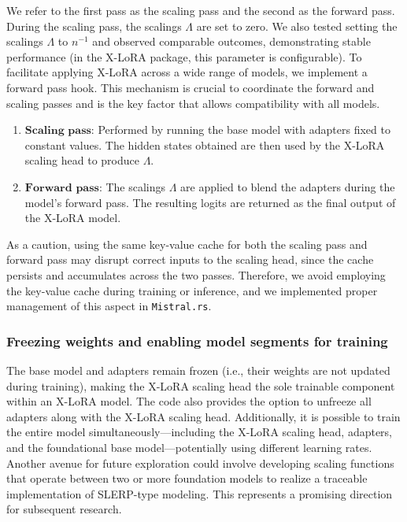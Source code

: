 We refer to the first pass as the scaling pass and the second as the forward pass. During the scaling pass, the scalings $\Lambda$ are set to zero. We also tested setting the scalings $\Lambda$ to ${n}^{-1}$ and observed comparable outcomes, demonstrating stable performance (in the X-LoRA package, this parameter is configurable). To facilitate applying X-LoRA across a wide range of models, we implement a forward pass hook. This mechanism is crucial to coordinate the forward and scaling passes and is the key factor that allows compatibility with all models.

\begin{enumerate}
    \item $\mathbf{Scaling}$ $\mathbf{pass}$: Performed by running the base model with adapters fixed to constant values. The hidden states obtained are then used by the X-LoRA scaling head to produce $\Lambda$.
    \item $\mathbf{Forward}$ $\mathbf{pass}$: The scalings $\Lambda$ are applied to blend the adapters during the model’s forward pass. The resulting logits are returned as the final output of the X-LoRA model.
\end{enumerate}

As a caution, using the same key-value cache for both the scaling pass and forward pass may disrupt correct inputs to the scaling head, since the cache persists and accumulates across the two passes. Therefore, we avoid employing the key-value cache during training or inference, and we implemented proper management of this aspect in \texttt{Mistral.rs}.

\subsubsection{Freezing weights and enabling model segments for training} The base model and adapters remain frozen (i.e., their weights are not updated during training), making the X-LoRA scaling head the sole trainable component within an X-LoRA model. The code also provides the option to unfreeze all adapters along with the X-LoRA scaling head. Additionally, it is possible to train the entire model simultaneously—including the X-LoRA scaling head, adapters, and the foundational base model—potentially using different learning rates. Another avenue for future exploration could involve developing scaling functions that operate between two or more foundation models to realize a traceable implementation of SLERP-type modeling. This represents a promising direction for subsequent research.

